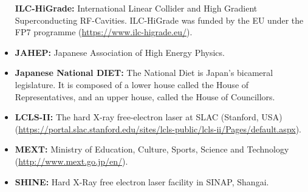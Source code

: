 \documentclass[%
 reprint,
 amsmath,amssymb,
 aps,
]{revtex4-1}
\begin{document}
\begin{itemize}
\textbf{ILC-HiGrade:} International Linear Collider and High Gradient Superconducting RF-Cavities. ILC-HiGrade was funded by the EU under the FP7 programme (\url{https://www.ilc-higrade.eu/}).
\item
\textbf{JAHEP:} Japanese Association of High Energy Physics.
\item
\textbf{Japanese National DIET:} The National Diet is Japan's bicameral legislature. It is composed of a lower house called the House of Representatives, and an upper house, called the House of Councillors.
\item
\textbf{LCLS-II:}  The hard X-ray free-electron laser at SLAC (Stanford, USA)(\url{https://portal.slac.stanford.edu/sites/lcls-public/lcls-ii/Pages/default.aspx}).
\item
\textbf{MEXT:} Ministry of Education, Culture, Sports, Science and Technology (\url{http://www.mext.go.jp/en/}).
\item
\textbf{SHINE:} Hard X-Ray free electron laser facility in SINAP, Shangai.

\end{itemize}
\end{document}
